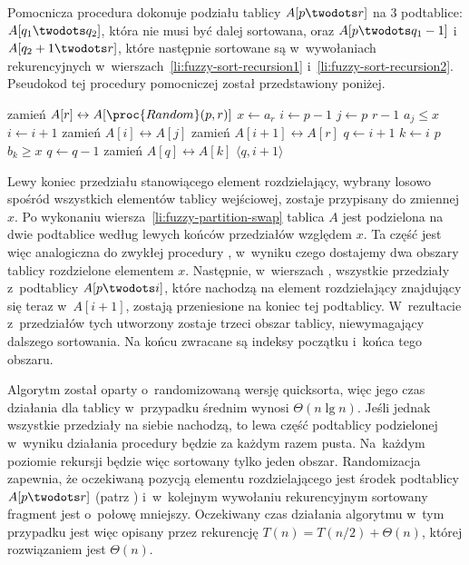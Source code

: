 Pomocnicza procedura  dokonuje podziału tablicy $A[p\twodots r]$ na 3 podtablice: $A[q_1\twodots q_2]$, która nie musi być dalej sortowana, oraz $A[p\twodots q_1-1]$ i~$A[q_2+1\twodots r]$, które następnie sortowane są w~wywołaniach rekurencyjnych w~wierszach~\ref{li:fuzzy-sort-recursion1} i~\ref{li:fuzzy-sort-recursion2}. Pseudokod tej procedury pomocniczej został przedstawiony poniżej.
\begin{codebox}
\li	zamień $A[r]\leftrightarrow A[\proc{Random}(p,r)]$
\li	$x\gets a_r$
\li $i\gets p-1$
\li	\For $j\gets p$ \To $r-1$
\li		\Do
			\If $a_j\le x$
\li				\Then
					$i\gets i+1$
\li					zamień $A[i]\leftrightarrow A[j]$
				\End
		\End
\li	zamień $A[i+1]\leftrightarrow A[r]$ \label{li:fuzzy-partition-swap}
\li	$q\gets i+1$ \label{li:fuzzy-partition-q-init}
\li	\For $k\gets i$ \Downto $p$
\li		\Do
			\If $b_k\ge x$
\li				\Then
					$q\gets q-1$
\li					zamień $A[q]\leftrightarrow A[k]$
				\End
		\End \label{li:fuzzy-partition-for-end}
\li	\Return $\langle q,i+1\rangle$
\end{codebox}
Lewy koniec przedziału stanowiącego element rozdzielający, wybrany losowo spośród wszystkich elementów tablicy wejściowej, zostaje przypisany do zmiennej $x$. Po wykonaniu wiersza~\ref{li:fuzzy-partition-swap} tablica $A$ jest podzielona na dwie podtablice według lewych końców przedziałów względem $x$. Ta część jest więc analogiczna do zwykłej procedury , w~wyniku czego dostajemy dwa obszary tablicy rozdzielone elementem $x$. Następnie, w~wierszach \doubledash{\ref{li:fuzzy-partition-q-init}}{\ref{li:fuzzy-partition-for-end}}, wszystkie przedziały z~podtablicy $A[p\twodots i]$, które nachodzą na element rozdzielający znajdujący się teraz w~$A[i+1]$, zostają przeniesione na koniec tej podtablicy. W~rezultacie z~przedziałów tych utworzony zostaje trzeci obszar tablicy, niewymagający dalszego sortowania. Na końcu zwracane są indeksy początku i~końca tego obszaru.

\subproblem %
Algorytm został oparty o~randomizowaną wersję quicksorta, więc jego czas działania dla tablicy  w~przypadku średnim wynosi $\Theta(n\lg n)$. Jeśli jednak wszystkie przedziały na siebie nachodzą, to lewa część podtablicy podzielonej w~wyniku działania procedury  będzie za każdym razem pusta. Na~każdym poziomie rekursji będzie więc sortowany tylko jeden obszar. Randomizacja zapewnia, że oczekiwaną pozycją elementu rozdzielającego jest środek podtablicy $A[p\twodots r]$ (patrz ) i~w~kolejnym wywołaniu rekurencyjnym sortowany fragment jest o~połowę mniejszy. Oczekiwany czas działania algorytmu w~tym przypadku jest więc opisany przez rekurencję $T(n)=T(n/2)+\Theta(n)$, której rozwiązaniem jest $\Theta(n)$.

\endinput